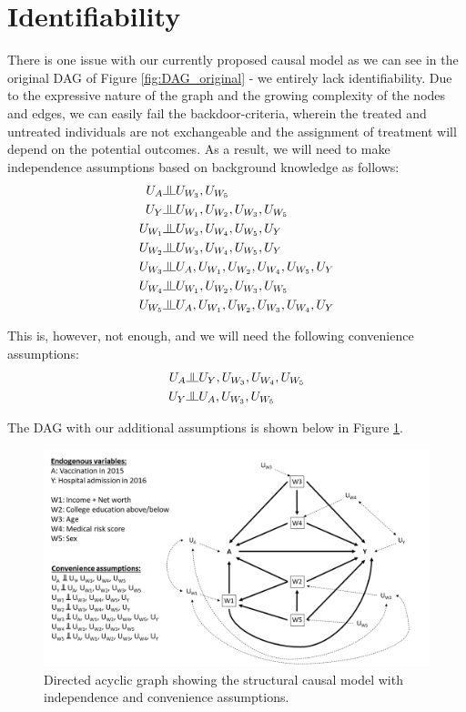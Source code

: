 \documentclass[english, 12pt]{article}
\newcommand{\indep}{\raisebox{0.05em}{\rotatebox[origin=c]{90}{$\models$}}}
\begin{document}
\section{Identifiability}
There is one issue with our currently proposed causal model as we can see in the original DAG of Figure \ref{fig:DAG_original} - we entirely lack identifiability. Due to the expressive nature of the graph and the growing complexity of the nodes and edges, we can easily fail the backdoor-criteria, wherein the treated and untreated individuals are not exchangeable and the assignment of treatment will depend on the potential outcomes. As a result, we will need to make independence assumptions based on background knowledge as follows:
\begin{align*}
U_{A} &\indep U_{W_{3}}, U_{W_{5}} \\
U_{Y} &\indep U_{W_{1}}, U_{W_{2}}, U_{W_{3}}, U_{W_{5}} \\
U_{W_{1}} &\indep U_{W_{3}}, U_{W_{4}}, U_{W_{5}}, U_{Y} \\
U_{W_{2}} &\indep U_{W_{3}}, U_{W_{4}}, U_{W_{5}}, U_{Y} \\
U_{W_{3}} &\indep U_{A}, U_{W_{1}}, U_{W_{2}}, U_{W_{4}}, U_{W_{5}}, U_{Y} \\
U_{W_{4}} &\indep U_{W_{1}}, U_{W_{2}}, U_{W_{3}}, U_{W_{5}} \\
U_{W_{5}} &\indep U_{A}, U_{W_{1}}, U_{W_{2}}, U_{W_{3}}, U_{W_{4}}, U_{Y}
\end{align*}

This is, however, not enough, and we will need the following convenience assumptions:
\begin{align*}
U_{A} &\indep U_{Y}, U_{W_{3}}, U_{W_{4}}, U_{W_{5}} \\
U_{Y} &\indep U_{A}, U_{W_{3}}, U_{W_{5}}
\end{align*}

The DAG with our additional assumptions is shown below in Figure \ref{fig:DAG_updated}.

\begin{figure}[H]
    \centering
    \includegraphics[scale=0.45]{figures/DAG_identifiable.png}
    \caption{Directed acyclic graph showing the structural causal model with independence and convenience assumptions.}
    \label{fig:DAG_updated}
\end{figure}
\end{document}
